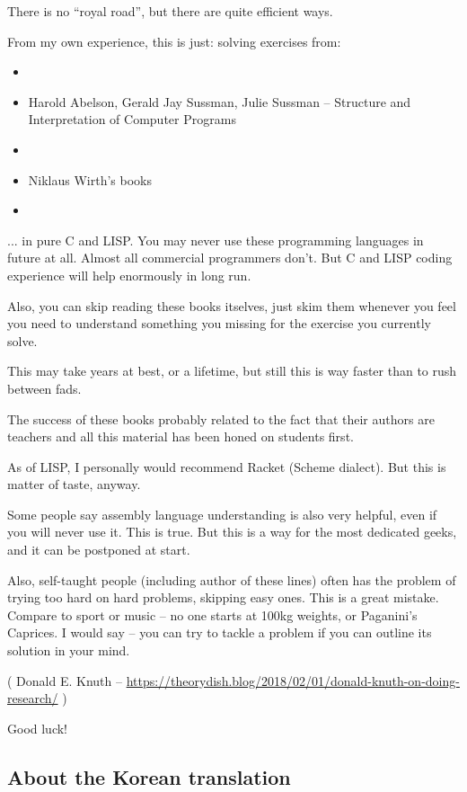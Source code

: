 There is no ``royal road'', but there are quite efficient ways.

From my own experience, this is just: solving exercises from:

\begin{itemize}
\item \KRBook
\item Harold Abelson, Gerald Jay Sussman, Julie Sussman -- Structure and Interpretation of Computer Programs
\item \TAOCP
\item Niklaus Wirth's books
\item \RobPikePractice
\end{itemize}

... in pure C and LISP.
You may never use these programming languages in future at all.
Almost all commercial programmers don’t. But C and LISP coding experience will help enormously in long run.

Also, you can skip reading these books itselves,
just skim them whenever you feel you need to understand something you missing for the exercise you currently solve.

This may take years at best, or a lifetime, but still this is way faster than to rush between fads.

The success of these books probably related to the fact that their authors are teachers
and all this material has been honed on students first.

As of LISP, I personally would recommend Racket (Scheme dialect). But this is matter of taste, anyway.

Some people say assembly language understanding is also very helpful, even if you will never use it.
This is true.
But this is a way for the most dedicated geeks, and it can be postponed at start.

Also, self-taught people (including author of these lines) often has the problem of trying too hard on hard problems,
skipping easy ones.
This is a great mistake.
Compare to sport or music -- no one starts at 100kg weights, or Paganini's Caprices.
I would say -- you can try to tackle a problem if you can outline its solution in your mind.


( Donald E. Knuth -- \url{https://theorydish.blog/2018/02/01/donald-knuth-on-doing-research/} )

Good luck!

\subsection*{About the Korean translation}

